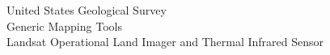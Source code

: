 \documentclass[draft]{agujournal2019}
\begin{document}
%
%

%
%


%
%
%
%


 \begin{acronyms}
    United States Geological Survey\\
    Generic Mapping Tools \\
   Landsat Operational Land Imager and Thermal Infrared Sensor \\
\end{acronyms}
\end{document}
